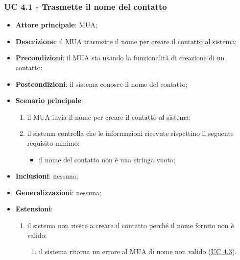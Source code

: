 \subsubsection{UC 4.1 - Trasmette il nome del contatto} \label{sec:UC4.1}
    \begin{itemize}
        \item \textbf{Attore principale}: MUA;
        \item \textbf{Descrizione}: il MUA trasmette il nome per creare il contatto al sistema;
        \item \textbf{Precondizioni}: il MUA sta usando la funzionalità di creazione di un contatto;
        \item \textbf{Postcondizioni}: il sistema conosce il nome del contatto;
        \item \textbf{Scenario principale}:
            \begin{enumerate}
                \item il MUA invia il nome per creare il contatto al sistema;
                \item il sistema controlla che le informazioni ricevute rispettino il seguente requisito minimo:
                    \begin{itemize}
                        \item il nome del contatto non è una stringa vuota;
                    \end{itemize}
            \end{enumerate}
        \item \textbf{Inclusioni}: nessuna;
        \item \textbf{Generalizzazioni}: nessuna;
        \item \textbf{Estensioni}:
            \begin{enumerate}[label=\alph*.]
                \item il sistema non riesce a creare il contatto perché il nome fornito non è valido:
                \begin{enumerate}[label=\arabic*.]
                    \item il sistema ritorna un errore al MUA di nome non valido (\hyperref[sec:UC4.3]{UC 4.3}).
                \end{enumerate}
            \end{enumerate}
    \end{itemize}


